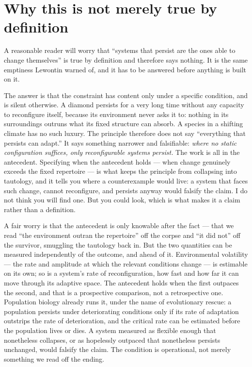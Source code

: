 \documentclass[11pt, a4paper]{report}
\begin{document}
\section{Why this is not merely true by definition}

A reasonable reader will worry that ``systems that persist are the ones able to change themselves'' is true by definition and therefore says nothing. It is the same emptiness Lewontin warned of, and it has to be answered before anything is built on it.

The answer is that the constraint has content only under a specific condition, and is silent otherwise. A diamond persists for a very long time without any capacity to reconfigure itself, because its environment never asks it to: nothing in its surroundings outruns what its fixed structure can absorb. A species in a shifting climate has no such luxury. The principle therefore does not say ``everything that persists can adapt.'' It says something narrower and falsifiable: \textit{where no static configuration suffices, only reconfigurable systems persist.} The work is all in the antecedent. Specifying when the antecedent holds --- when change genuinely exceeds the fixed repertoire --- is what keeps the principle from collapsing into tautology, and it tells you where a counterexample would live: a system that faces such change, cannot reconfigure, and persists anyway would falsify the claim. I do not think you will find one. But you could look, which is what makes it a claim rather than a definition.

A fair worry is that the antecedent is only knowable after the fact --- that we read ``the environment outran the repertoire'' off the corpse and ``it did not'' off the survivor, smuggling the tautology back in. But the two quantities can be measured independently of the outcome, and ahead of it. Environmental volatility --- the rate and amplitude at which the relevant conditions change --- is estimable on its own; so is a system's rate of reconfiguration, how fast and how far it can move through its adaptive space. The antecedent holds when the first outpaces the second, and that is a prospective comparison, not a retrospective one. Population biology already runs it, under the name of evolutionary rescue: a population persists under deteriorating conditions only if its rate of adaptation outstrips the rate of deterioration, and the critical rate can be estimated before the population lives or dies. A system measured as flexible enough that nonetheless collapses, or as hopelessly outpaced that nonetheless persists unchanged, would falsify the claim. The condition is operational, not merely something we read off the ending.
\end{document}
